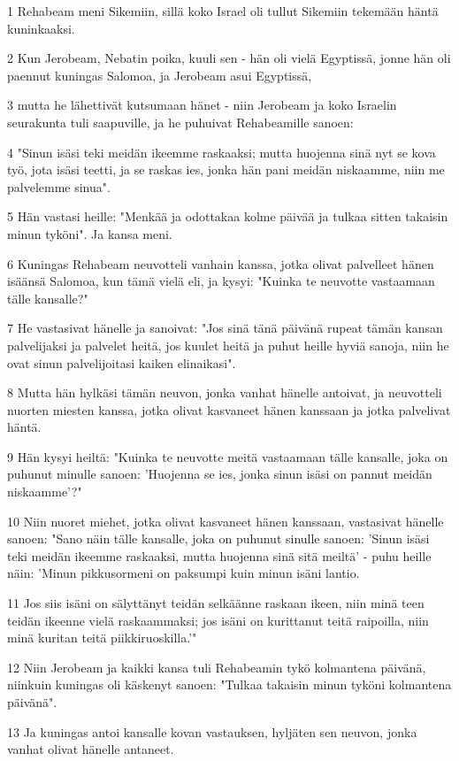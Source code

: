 \par 1 Rehabeam meni Sikemiin, sillä koko Israel oli tullut Sikemiin tekemään häntä kuninkaaksi.
\par 2 Kun Jerobeam, Nebatin poika, kuuli sen - hän oli vielä Egyptissä, jonne hän oli paennut kuningas Salomoa, ja Jerobeam asui Egyptissä,
\par 3 mutta he lähettivät kutsumaan hänet - niin Jerobeam ja koko Israelin seurakunta tuli saapuville, ja he puhuivat Rehabeamille sanoen:
\par 4 "Sinun isäsi teki meidän ikeemme raskaaksi; mutta huojenna sinä nyt se kova työ, jota isäsi teetti, ja se raskas ies, jonka hän pani meidän niskaamme, niin me palvelemme sinua".
\par 5 Hän vastasi heille: "Menkää ja odottakaa kolme päivää ja tulkaa sitten takaisin minun tyköni". Ja kansa meni.
\par 6 Kuningas Rehabeam neuvotteli vanhain kanssa, jotka olivat palvelleet hänen isäänsä Salomoa, kun tämä vielä eli, ja kysyi: "Kuinka te neuvotte vastaamaan tälle kansalle?"
\par 7 He vastasivat hänelle ja sanoivat: "Jos sinä tänä päivänä rupeat tämän kansan palvelijaksi ja palvelet heitä, jos kuulet heitä ja puhut heille hyviä sanoja, niin he ovat sinun palvelijoitasi kaiken elinaikasi".
\par 8 Mutta hän hylkäsi tämän neuvon, jonka vanhat hänelle antoivat, ja neuvotteli nuorten miesten kanssa, jotka olivat kasvaneet hänen kanssaan ja jotka palvelivat häntä.
\par 9 Hän kysyi heiltä: "Kuinka te neuvotte meitä vastaamaan tälle kansalle, joka on puhunut minulle sanoen: 'Huojenna se ies, jonka sinun isäsi on pannut meidän niskaamme'?"
\par 10 Niin nuoret miehet, jotka olivat kasvaneet hänen kanssaan, vastasivat hänelle sanoen: "Sano näin tälle kansalle, joka on puhunut sinulle sanoen: 'Sinun isäsi teki meidän ikeemme raskaaksi, mutta huojenna sinä sitä meiltä' - puhu heille näin: 'Minun pikkusormeni on paksumpi kuin minun isäni lantio.
\par 11 Jos siis isäni on sälyttänyt teidän selkäänne raskaan ikeen, niin minä teen teidän ikeenne vielä raskaammaksi; jos isäni on kurittanut teitä raipoilla, niin minä kuritan teitä piikkiruoskilla.'"
\par 12 Niin Jerobeam ja kaikki kansa tuli Rehabeamin tykö kolmantena päivänä, niinkuin kuningas oli käskenyt sanoen: "Tulkaa takaisin minun tyköni kolmantena päivänä".
\par 13 Ja kuningas antoi kansalle kovan vastauksen, hyljäten sen neuvon, jonka vanhat olivat hänelle antaneet.
